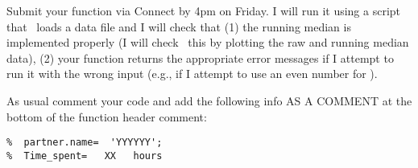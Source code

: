 \documentclass[letterpaper,12pt]{article}
\begin{document}
Submit your function  via Connect by 4pm on Friday.  I will run it using a script that \
loads a data file and I will check that (1) the running median is implemented properly (I will check \
this by plotting the raw and running median data), (2) your function returns the 
appropriate error messages if I attempt to run it with the wrong input (e.g., if I attempt 
to use an even number for \mcode{winlen}).  


 As usual comment your code and add the following info AS A COMMENT at the bottom of the function header comment:
\begin{lstlisting}
%  partner.name=  'YYYYYY';
%  Time_spent=   XX   hours
\end{lstlisting}
 
\end{document}
